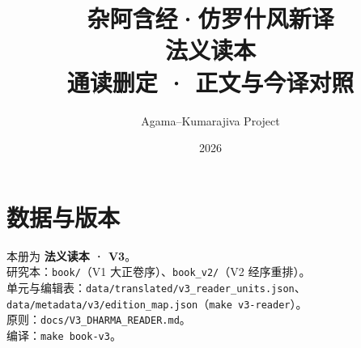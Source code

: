 \documentclass[UTF8, zihao=-4, openany, fontset=none]{ctexbook}
\title{\textbf{杂阿含经·仿罗什风新译}\\[0.5em]
\large 法义读本\\[0.35em]
\normalsize 通读删定 · 正文与今译对照}
\author{Agama–Kumarajiva Project}
\date{2026}
\begin{document}

\clearpage
{}
\setcounter{page}{1}
\tableofcontents
\clearpage





\mainmatter


\backmatter


\chapter*{数据与版本}
\noindent 本册为 \textbf{法义读本 · V3}。\\
研究本：\texttt{book/}（V1 大正卷序）、\texttt{book\_v2/}（V2 经序重排）。\\
单元与编辑表：\texttt{data/translated/v3\_reader\_units.json}、
\texttt{data/metadata/v3/edition\_map.json}（\texttt{make v3-reader}）。\\
原则：\texttt{docs/V3\_DHARMA\_READER.md}。\\
编译：\texttt{make book-v3}。
\end{document}
